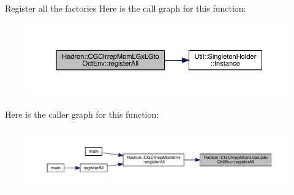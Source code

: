 Register all the factories Here is the call graph for this function\+:\nopagebreak
\begin{figure}[H]
\begin{center}
\leavevmode
\includegraphics[width=350pt]{da/d36/namespaceHadron_1_1CGCIrrepMomLGxLGtoOctEnv_af4080789e3dc09dd752e71cb20ff3cb7_cgraph}
\end{center}
\end{figure}
Here is the caller graph for this function\+:
\nopagebreak
\begin{figure}[H]
\begin{center}
\leavevmode
\includegraphics[width=350pt]{da/d36/namespaceHadron_1_1CGCIrrepMomLGxLGtoOctEnv_af4080789e3dc09dd752e71cb20ff3cb7_icgraph}
\end{center}
\end{figure}
